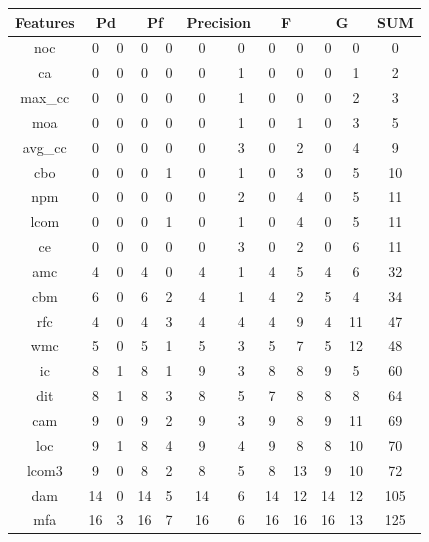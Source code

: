 \documentclass{sig-alternative}
\begin{document}
\begin{figure}[!ht]
\scriptsize
\centering
  \begin{tabular}{c|c c|c c|c c|c c|c c|c }
  \hline\hline
  Features & \multicolumn{2}{c}{Pd} & \multicolumn{2}{c}{Pf} & \multicolumn{2}{c}{Precision} & \multicolumn{2}{c}{F} & \multicolumn{2}{c}{G} & SUM
\\\hline
  noc& 0& 0& 0& 0& 0& 0& 0& 0& 0& 0& 0\\
ca& 0& 0& 0& 0& 0& 1& 0& 0& 0& 1& 2\\
max\_cc& 0& 0& 0& 0& 0& 1& 0& 0& 0& 2& 3\\
moa& 0& 0& 0& 0& 0& 1& 0& 1& 0& 3& 5\\
avg\_cc& 0& 0& 0& 0& 0& 3& 0& 2& 0& 4& 9\\
cbo& 0& 0& 0& 1& 0& 1& 0& 3& 0& 5& 10\\
npm& 0& 0& 0& 0& 0& 2& 0& 4& 0& 5& 11\\
lcom& 0& 0& 0& 1& 0& 1& 0& 4& 0& 5& 11\\
ce& 0& 0& 0& 0& 0& 3& 0& 2& 0& 6& 11\\
amc& 4& 0& 4& 0& 4& 1& 4& 5& 4& 6& 32\\
cbm& 6& 0& 6& 2& 4& 1& 4& 2& 5& 4& 34\\
rfc& 4& 0& 4& 3& 4& 4& 4& 9& 4& 11& 47\\
wmc& 5& 0& 5& 1& 5& 3& 5& 7& 5& 12& 48\\
ic& 8& 1& 8& 1& 9& 3& 8& 8& 9& 5& 60\\
dit& 8& 1& 8& 3& 8& 5& 7& 8& 8& 8& 64\\
cam& 9& 0& 9& 2& 9& 3& 9& 8& 9& 11& 69\\
loc& 9& 1& 8& 4& 9& 4& 9& 8& 8& 10& 70\\
lcom3& 9& 0& 8& 2& 8& 5& 8& 13& 9& 10& 72\\
dam& 14& 0& 14& 5& 14& 6& 14& 12& 14& 12& 105\\
mfa& 16& 3& 16& 7& 16& 6& 16& 16& 16& 13& 125\\

  \end{tabular}
\end{figure}
\end{document}
